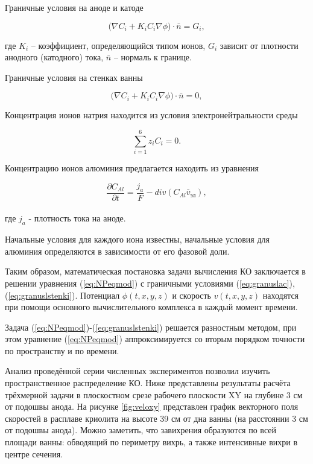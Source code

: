 \documentclass[pdflatex,sn-mathphys-gost]{pmi-jnl}
\begin{document}
Граничные условия на аноде и катоде

\begin{equation}\label{eq:granuslac}
	\big(\nabla C_i + K_i C_i \nabla \phi \big) \cdot \bar{n} = G_i, 
\end{equation}

где $K_i$ – коэффициент, определяющийся типом ионов,  $G_i$ зависит от плотности анодного (катодного) тока, $\bar{n}$ – нормаль к границе.

Граничные условия на стенках ванны

\begin{equation}\label{eq:granuslstenki}
	\big(\nabla C_i + K_i C_i \nabla \phi \big) \cdot \bar{n} = 0,
\end{equation}

Концентрация ионов натрия находится из условия электронейтральности среды

\[ \sum\limits_{i=1}^6 z_iC_i = 0. \]

Концентрацию ионов алюминия предлагается находить из уравнения 

\[ \frac{\partial C_{Al}}{\partial t} = \frac{j_a}{F} - div(C_{Al} \bar{v}_{\text{эл}}), \]
\\
где $j_a$ - плотность тока на аноде.

Начальные условия для каждого иона известны, начальные условия для алюминия определяются в зависимости от его фазовой доли. 

Таким образом, математическая постановка задачи вычисления КО заключается в решении уравнения (\ref{eq:NPeqmod}) с граничными условиями (\ref{eq:granuslac}), (\ref{eq:granuslstenki}). Потенциал $\phi(t,x,y,z)$ и скорость $v(t,x,y,z)$ находятся при помощи основного вычислительного комплекса в каждый момент времени.

Задача (\ref{eq:NPeqmod})-(\ref{eq:granuslstenki}) решается разностным методом, при этом уравнение (\ref{eq:NPeqmod}) аппроксимируется со вторым порядком точности по пространству и по времени.

Анализ проведённой серии численных экспериментов позволил изучить пространственное распределение КО. 
Ниже представлены результаты расчёта трёхмерной задачи в плоскостном срезе рабочего плоскости XY на глубине 3 см от подошвы анода. На рисунке \ref{fig:veloxy} представлен график векторного поля скоростей в расплаве криолита на высоте 39 см от дна ванны (на расстоянии 3 см от подошвы анода). Можно заметить, что завихрения образуются по всей площади ванны: обводящий по периметру вихрь, а также интенсивные вихри в центре сечения.
\end{document}
